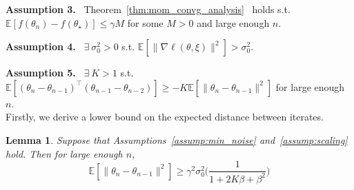 \documentclass[conference]{IEEEtran}
\newcommand{\Ex}[1]{\mathbb{E}[ #1 ]}
\newtheorem{lemma}[theorem]{Lemma}
\begin{document}
\vspace{0.05in}

\noindent\textbf{Assumption 3.} \ Theorem~\ref{thm:mom_convg_analysis}~\cite{Report:Yang_arXiv16} holds s.t. $\Ex{ f(\theta_n) - f(\theta_\star) } \leq \gamma M$ for some $M > 0$ and large enough $n$. 

\vspace{0.05in}

\noindent\textbf{Assumption 4.} \ $\exists \ \sigma_0^2 > 0$ s.t. $\Ex{ \| \nabla \ell (\theta, \xi) \|^2 } > \sigma_0^2$.

\vspace{0.05in}

\noindent\textbf{Assumption 5.} \ $\exists \ K > 1$ s.t. $\Ex{ (\theta_n - \theta_{n-1})^\top (\theta_{n-1} - \theta_{n-2}) } \geq - K \Ex{ \| \theta_n - \theta_{n-1} \|^2 }$ for large enough $n$.\\


Firstly, we  derive a lower bound on the expected distance between iterates.
\begin{lemma}
\label{lemma:lower_bound_thetadiff}
Suppose that Assumptions~\ref{assump:min_noise} and~\ref{assump:scaling} hold.
Then for large enough $n$,
\begin{equation*}
\mathbb{E} [ \| \theta_n - \theta_{n-1} \|^2 ] \geq
\gamma^2 \sigma_0^2 \biggl( \frac{1}{1 + 2 K \beta + \beta^2} \biggr)
\end{equation*}
\end{lemma}
\end{document}
